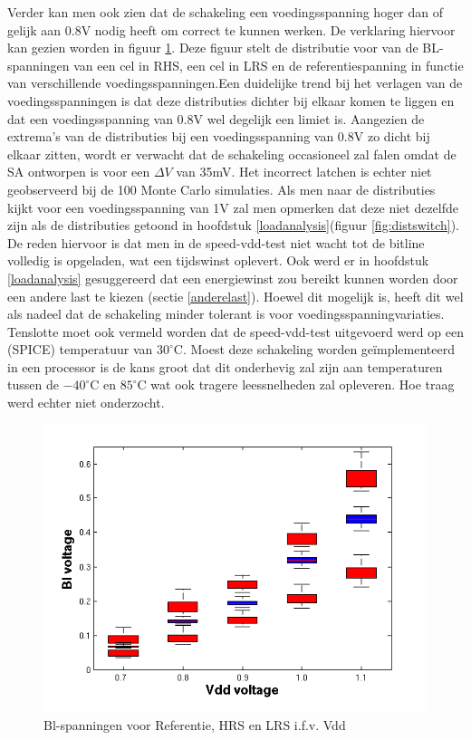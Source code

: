 Verder kan men ook zien dat de schakeling een voedingsspanning hoger dan of gelijk aan 0.8V nodig heeft om correct te kunnen werken. De verklaring hiervoor kan gezien worden in figuur \ref{fig:vblvdd}. Deze figuur stelt de distributie voor van de BL-spanningen van een cel in RHS, een cel in LRS en de referentiespanning in functie van verschillende voedingsspanningen.Een duidelijke trend bij het verlagen van de voedingsspanningen  is dat deze distributies dichter bij elkaar komen te liggen en dat een voedingsspanning van 0.8V wel degelijk een limiet is. Aangezien de extrema's van de distributies bij een voedingsspanning van 0.8V zo dicht bij elkaar zitten, wordt er verwacht dat de schakeling occasioneel zal falen omdat de SA ontworpen is voor een $\Delta V$ van 35mV. Het incorrect latchen is echter niet geobserveerd bij de 100 Monte Carlo simulaties.
Als men naar de distributies kijkt voor een voedingsspanning van 1V zal men opmerken dat deze niet dezelfde zijn als de distributies getoond in hoofdstuk \ref{loadanalysis}(figuur \ref{fig:distswitch}). De reden hiervoor is dat men in de speed-vdd-test niet wacht tot de bitline volledig is opgeladen, wat een tijdswinst oplevert. Ook werd er in hoofdstuk \ref{loadanalysis} gesuggereerd dat een energiewinst zou bereikt kunnen worden door een andere last te kiezen (sectie \ref{anderelast}). Hoewel dit mogelijk is, heeft dit wel als nadeel dat de schakeling minder tolerant is voor voedingsspanningvariaties. Tenslotte moet ook vermeld worden dat de speed-vdd-test uitgevoerd werd op een (SPICE) temperatuur van $30^{\circ}\mathrm{C}$. Moest deze schakeling worden geïmplementeerd in een processor is de kans groot dat dit onderhevig zal zijn aan temperaturen tussen de $-40^{\circ}\mathrm{C}$ en $85^{\circ}\mathrm{C}$ wat ook tragere leessnelheden zal opleveren. Hoe traag werd echter niet onderzocht.

\begin{figure}[!ht]
  \centering
  \includegraphics[scale=0.8]{../fig/hfdst-final-vddbl.png}
  \caption[Bl-spanningen i.f.v. Vdd]{Bl-spanningen voor Referentie, HRS en LRS i.f.v. Vdd}
  \label{fig:vblvdd}
\end{figure}

